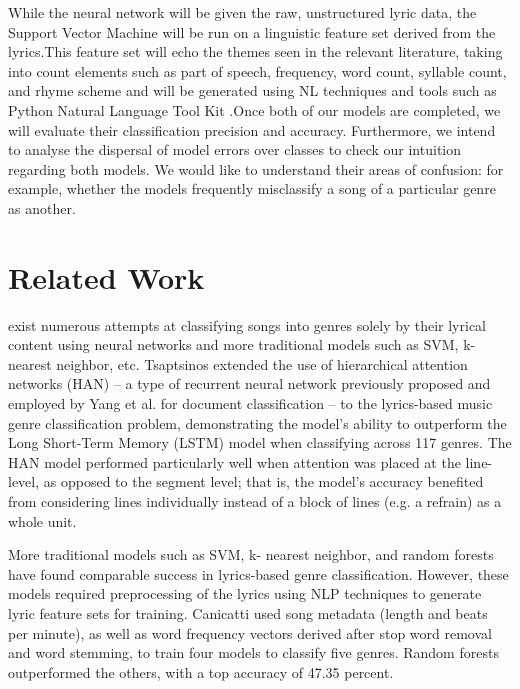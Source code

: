 \documentclass[journal]{IEEEtran}
\begin{document}
While the neural network will be given the raw, unstructured lyric data, the Support Vector Machine will be run on a linguistic feature set derived from the lyrics.This feature set will echo the themes seen in the relevant literature, taking into count elements such as part of speech, frequency, word count, syllable count, and rhyme scheme and will be generated using NL techniques and tools such as Python Natural Language Tool Kit \cite{NLTK}.Once both of our models are completed, we will evaluate their classification precision and accuracy. Furthermore, we intend to analyse the dispersal of model errors over classes to check our intuition regarding both models. We would like to understand their areas of confusion: for example, whether the models frequently misclassify a song of a particular genre as another.



\section{Related Work}

 exist numerous attempts at classifying songs into genres solely by their lyrical content using neural networks and more traditional models such as SVM, k-nearest neighbor, etc.
Tsaptsinos \cite{tsaptsinos} extended the use of hierarchical attention networks (HAN) -- a type of recurrent neural network previously proposed and employed by Yang et al. \cite{Yang} for document classification -- to the lyrics-based music genre classification problem, demonstrating the model's ability to outperform the Long Short-Term Memory (LSTM) model when classifying across 117 genres. The HAN model performed particularly well when attention was placed at the line-level, as opposed to the segment level; that is, the model's accuracy benefited from considering lines individually instead of a block of lines (e.g. a refrain) as a whole unit. \par

More traditional models such as SVM, k- nearest neighbor, and random forests have found comparable success in lyrics-based genre classification. However, these models required preprocessing of the lyrics using NLP techniques to generate lyric feature sets for training. Canicatti \cite{canicatti} used song metadata (length and beats per minute), as well as word frequency vectors derived after stop word removal and word stemming, to train four models to classify five genres. Random forests outperformed the others, with a top accuracy of 47.35 percent. \par
\end{document}
